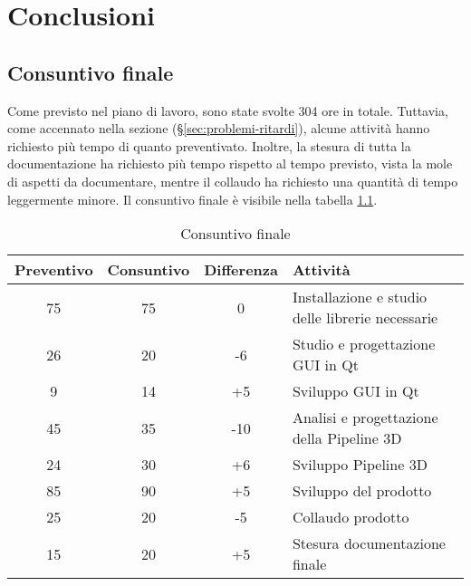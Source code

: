 
\chapter{Conclusioni}
\label{cap:conclusioni}

\section{Consuntivo finale}
Come previsto nel piano di lavoro, sono state svolte 304 ore in totale. Tuttavia, come accennato nella sezione  (§\ref{sec:problemi-ritardi}), alcune attività hanno richiesto più tempo di quanto preventivato. Inoltre, la stesura di tutta la documentazione ha richiesto più tempo rispetto al tempo previsto, vista la mole di aspetti da documentare, mentre il collaudo ha richiesto una quantità di tempo leggermente minore. Il consuntivo finale è visibile nella tabella \ref{table:consuntivo-finale}.

\begin{center}
    \begin{table}[h]
    \def\arraystretch{1.5}
    \setlength\extrarowheight{5pt}
    \begin{tabular}{| c | c | c | p{5cm} |}
        \hline
        \textbf{Preventivo} & \textbf{Consuntivo} & \textbf{Differenza} & \textbf{Attività} \\ \hline  
        75 & 75 & 0 & Installazione e studio delle librerie necessarie\\ \hline
        26 & 20 & -6 & Studio e progettazione GUI in Qt\\ \hline
        9 & 14 & +5 & Sviluppo GUI in Qt\\ \hline
        45 & 35 & -10 & Analisi e progettazione della Pipeline 3D\\ \hline
        24 & 30 & +6 & Sviluppo Pipeline 3D\\ \hline
        85 & 90 & +5 & Sviluppo del prodotto\\ \hline
        25 & 20 & -5 & Collaudo prodotto\\ \hline
        15 & 20 & +5 & Stesura documentazione finale\\ \hline
    \end{tabular}
    \caption{Consuntivo finale}
    \label{table:consuntivo-finale}
    \end{table}
\end{center}

